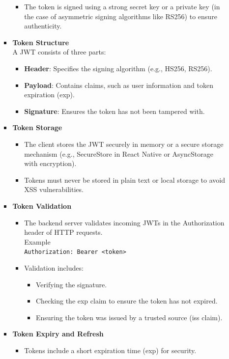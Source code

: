 \documentclass[12pt, titlepage]{article}
\begin{document}
\begin{enumerate}
\begin{itemize}
\begin{itemize}
\begin{itemize}
				\item The token is signed using a strong secret key or a private key (in the case of asymmetric signing algorithms like RS256) to ensure authenticity.
			\end{itemize}
			\item \textbf{Token Structure}
			\\ A JWT consists of three parts:
			\begin{itemize}
				\item \textbf{Header}: Specifies the signing algorithm (e.g., HS256, RS256).
				\item \textbf{Payload}: Contains claims, such as user information and token expiration (exp).
				\item \textbf{Signature}: Ensures the token has not been tampered with.
			\end{itemize}
			\item \textbf{Token Storage}
			\begin{itemize}
				\item The client stores the JWT securely in memory or a secure storage mechanism (e.g., SecureStore in React Native or AsyncStorage with encryption).
				\item Tokens must never be stored in plain text or local storage to avoid XSS vulnerabilities.
			\end{itemize}
			\item \textbf{Token Validation}
			\begin{itemize}
				\item The backend server validates incoming JWTs in the Authorization header of HTTP requests.
				\\ Example \\
				\texttt{Authorization: Bearer <token>}
				\item Validation includes:
				\begin{itemize}
					\item Verifying the signature.
					\item Checking the exp claim to ensure the token has not expired.
					\item Ensuring the token was issued by a trusted source (iss claim).
				\end{itemize}
			\end{itemize}
			\item \textbf{Token Expiry and Refresh}
			\begin{itemize}
				\item Tokens include a short expiration time (exp) for security.

\end{itemize}
\end{itemize}
\end{itemize}
\end{enumerate}
\end{document}
